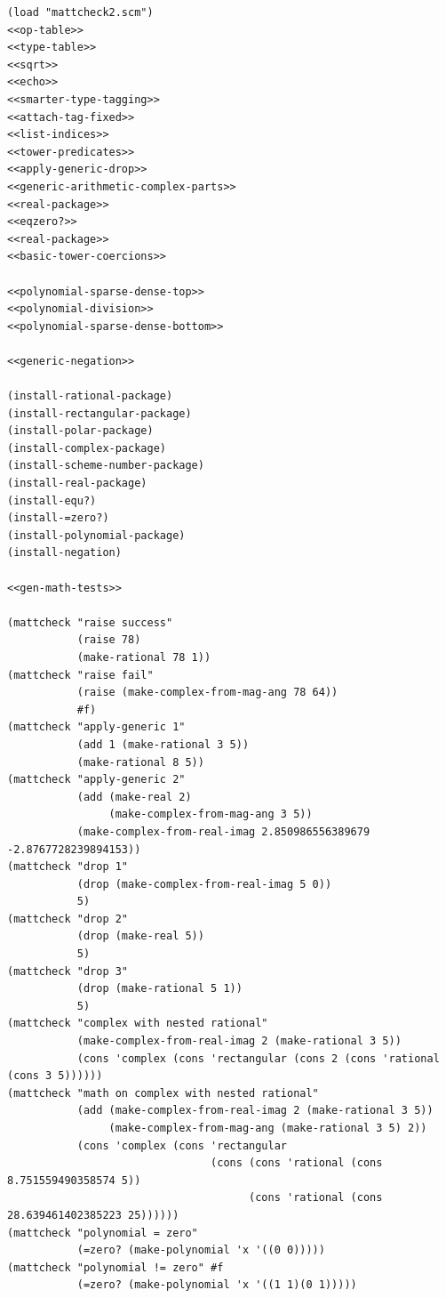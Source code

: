 \documentclass[final,fleqn,titlepage,twoside]{article}
\begin{document}
\begin{verbatim}
(load "mattcheck2.scm")
<<op-table>>
<<type-table>>
<<sqrt>>
<<echo>>
<<smarter-type-tagging>>
<<attach-tag-fixed>>
<<list-indices>>
<<tower-predicates>>
<<apply-generic-drop>>
<<generic-arithmetic-complex-parts>>
<<real-package>>
<<eqzero?>>
<<real-package>>
<<basic-tower-coercions>>

<<polynomial-sparse-dense-top>>
<<polynomial-division>>
<<polynomial-sparse-dense-bottom>>

<<generic-negation>>

(install-rational-package)
(install-rectangular-package)
(install-polar-package)
(install-complex-package)
(install-scheme-number-package)
(install-real-package)
(install-equ?)
(install-=zero?)
(install-polynomial-package)
(install-negation)

<<gen-math-tests>>

(mattcheck "raise success"
           (raise 78)
           (make-rational 78 1))
(mattcheck "raise fail"
           (raise (make-complex-from-mag-ang 78 64))
           #f)
(mattcheck "apply-generic 1"
           (add 1 (make-rational 3 5))
           (make-rational 8 5))
(mattcheck "apply-generic 2"
           (add (make-real 2)
                (make-complex-from-mag-ang 3 5))
           (make-complex-from-real-imag 2.850986556389679 -2.8767728239894153))
(mattcheck "drop 1"
           (drop (make-complex-from-real-imag 5 0))
           5)
(mattcheck "drop 2"
           (drop (make-real 5))
           5)
(mattcheck "drop 3"
           (drop (make-rational 5 1))
           5)
(mattcheck "complex with nested rational"
           (make-complex-from-real-imag 2 (make-rational 3 5))
           (cons 'complex (cons 'rectangular (cons 2 (cons 'rational (cons 3 5))))))
(mattcheck "math on complex with nested rational"
           (add (make-complex-from-real-imag 2 (make-rational 3 5))
                (make-complex-from-mag-ang (make-rational 3 5) 2))
           (cons 'complex (cons 'rectangular
                                (cons (cons 'rational (cons 8.751559490358574 5))
                                      (cons 'rational (cons 28.639461402385223 25))))))
(mattcheck "polynomial = zero"
           (=zero? (make-polynomial 'x '((0 0)))))
(mattcheck "polynomial != zero" #f
           (=zero? (make-polynomial 'x '((1 1)(0 1)))))


\end{verbatim}
\end{document}
